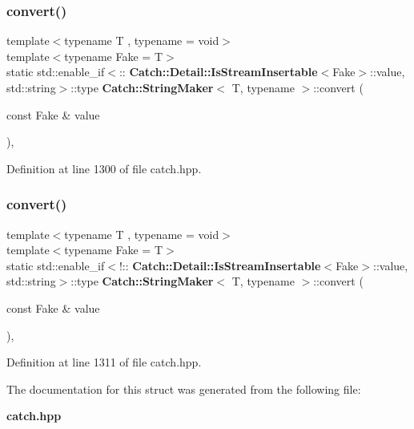 \subsubsection{convert()\hspace{0.1cm}{\footnotesize\ttfamily [1/2]}}
{\footnotesize\ttfamily template$<$typename T , typename  = void$>$ \\
template$<$typename Fake  = T$>$ \\
static std\+::enable\+\_\+if$<$\+::\textbf{ Catch\+::\+Detail\+::\+Is\+Stream\+Insertable}$<$Fake$>$\+::value, std\+::string$>$\+::type \textbf{ Catch\+::\+String\+Maker}$<$ T, typename $>$\+::convert (\begin{DoxyParamCaption}\item[{const Fake \&}]{value }\end{DoxyParamCaption})\hspace{0.3cm}{\ttfamily [inline]}, {\ttfamily [static]}}



Definition at line 1300 of file catch.\+hpp.

\mbox{\label{struct_catch_1_1_string_maker_a68bb548de0e5ad364228b1ca3dd2f561}} 
\subsubsection{convert()\hspace{0.1cm}{\footnotesize\ttfamily [2/2]}}
{\footnotesize\ttfamily template$<$typename T , typename  = void$>$ \\
template$<$typename Fake  = T$>$ \\
static std\+::enable\+\_\+if$<$!\+::\textbf{ Catch\+::\+Detail\+::\+Is\+Stream\+Insertable}$<$Fake$>$\+::value, std\+::string$>$\+::type \textbf{ Catch\+::\+String\+Maker}$<$ T, typename $>$\+::convert (\begin{DoxyParamCaption}\item[{const Fake \&}]{value }\end{DoxyParamCaption})\hspace{0.3cm}{\ttfamily [inline]}, {\ttfamily [static]}}



Definition at line 1311 of file catch.\+hpp.



The documentation for this struct was generated from the following file\+:\begin{DoxyCompactItemize}
\item 
\textbf{ catch.\+hpp}\end{DoxyCompactItemize}
